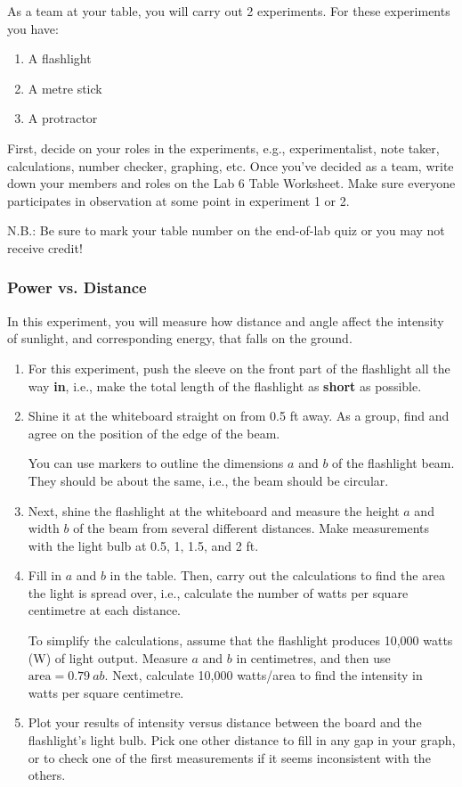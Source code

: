 \documentclass[main.tex]{subfiles}
\begin{document}
As a team at your table, you will carry out 2 experiments. For these experiments you have:
\begin{enumerate}
\item A flashlight
\item A metre stick
\item A protractor
\end{enumerate}

First, decide on your roles in the experiments, e.g., experimentalist, note taker, calculations, number checker, graphing, etc. Once you've decided as a team, write down your members and roles on the Lab 6 Table Worksheet. Make sure everyone participates in observation at some point in experiment 1 or 2.

N.B.: Be sure to mark your table number on the end-of-lab quiz or you may not receive credit!

\subsubsection{Power vs. Distance}
In this experiment, you will measure how distance and angle affect the intensity of sunlight, and corresponding energy, that falls on the ground.

\begin{enumerate}[1.]
\item For this experiment, push the sleeve on the front part of the flashlight all the way \textbf{in}, i.e., make the total length of the flashlight as \textbf{short} as possible.

\item Shine it at the whiteboard straight on from 0.5 ft away. As a group, find and agree on the position of the edge of the beam.


You can use markers to outline the dimensions $a$ and $b$ of the flashlight beam. They should be about the same, i.e., the beam should be circular.

\item Next, shine the flashlight at the whiteboard and measure the height $a$ and width $b$ of the beam from several different distances. Make measurements with the light bulb at 0.5, 1, 1.5, and 2 ft.

\item Fill in $a$ and $b$ in the table. Then, carry out the calculations to find the area the light is spread over, i.e., calculate the number of watts per square centimetre at each distance.

To simplify the calculations, assume that the flashlight produces 10,000 watts (\si{\W}) of light output. Measure $a$ and $b$ in centimetres, and then use $\text{area} = 0.79\ ab$. Next, calculate 10,000 watts/area to find the intensity in watts per square centimetre.

\item Plot your results of intensity versus distance between the board and the flashlight's light bulb. Pick one other distance to fill in any gap in your graph, or to check one of the first measurements if it seems inconsistent with the others.

\end{enumerate}
\end{document}
